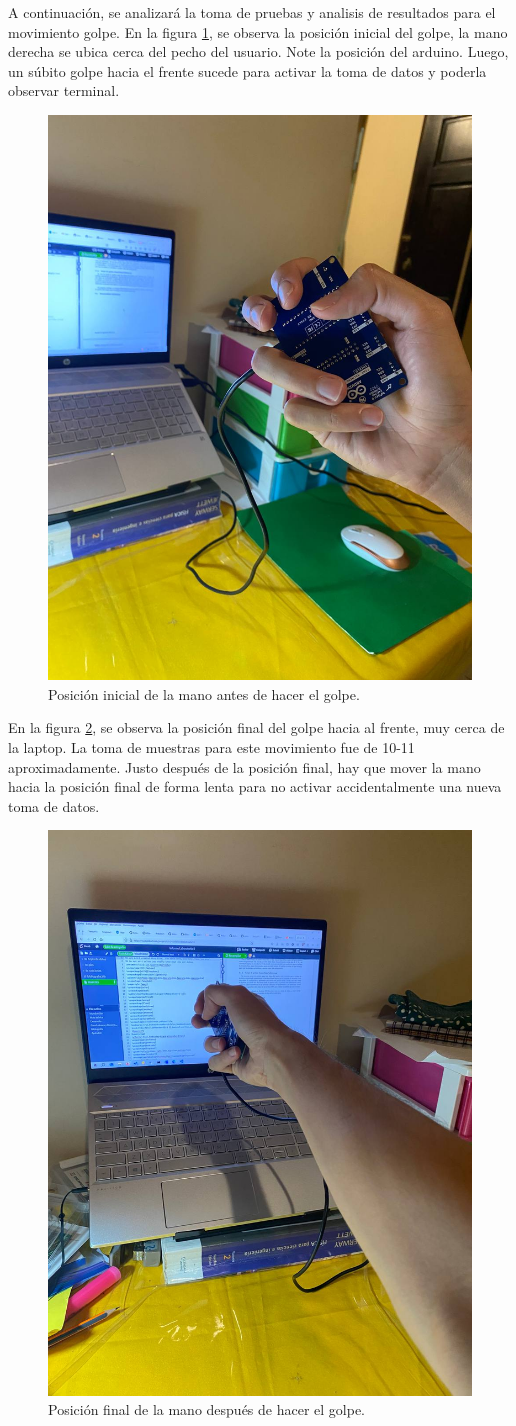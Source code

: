 A continuación, se analizará la toma de pruebas y analisis de resultados para el movimiento golpe. En la figura \ref{golpe1}, se observa la posición inicial del golpe, la mano derecha se ubica cerca del pecho del usuario. Note la posición del arduino. Luego, un súbito golpe hacia el frente sucede para activar la toma de datos y poderla observar terminal. 

\begin{figure}[H]
        \centering
        \includegraphics[width=0.5\linewidth]{pics/golpe1.jpg}
        \caption{Posición inicial de la mano antes de hacer el golpe.}
        \label{golpe1}
    \end{figure}

En la figura \ref{golpe2}, se observa la posición final del golpe hacia al frente, muy cerca de la laptop. La toma de muestras para este movimiento fue de 10-11 aproximadamente. Justo después de la posición final, hay que mover la mano hacia la posición final de forma lenta para no activar accidentalmente una nueva toma de datos.

    \begin{figure}[H]
        \centering
        \includegraphics[width=0.5\linewidth]{pics/golpe2.jpg}
        \caption{Posición final de la mano después de hacer el golpe.}
        \label{golpe2}
    \end{figure}

